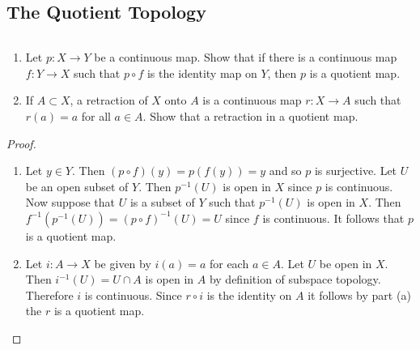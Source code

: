 \subsection{The Quotient Topology}
\begin{ex}{22.2}
    ${}$
    \begin{enumerate}
        \item Let $p:X\to Y$ be a continuous map. Show that if there is a continuous map $f:Y\to X$ such that $p\circ f$ is the identity map on $Y$, then $p$ is a quotient map.
        \item If $A\subset X$, a retraction of $X$ onto $A$ is a continuous map $r:X\to A$ such that $r(a)=a$ for all $a\in A$. Show that a retraction in a quotient map.
    \end{enumerate}
\end{ex}
\begin{proof}
    ${}$
    \begin{enumerate}
        \item Let $y\in Y$. Then $(p\circ f)(y)=p\left(f(y)\right)=y$ and so $p$ is surjective. 
            Let $U$ be an open subset of $Y$. Then $p^{-1}(U)$ is open in $X$ since $p$ is continuous.
            Now suppose that $U$ is a subset of $Y$ such that $p^{-1}(U)$ is open in $X$. Then $f^{-1}\left(p^{-1}(U)\right)=(p\circ f)^{-1}(U)=U$ since $f$ is continuous.
            It follows that $p$ is a quotient map.
        \item Let $i:A\to X$ be given by $i(a)=a$ for each $a\in A$. Let $U$ be open in $X$. Then $i^{-1}(U)=U\cap A$ is open in $A$ by definition of subspace topology. Therefore $i$ is continuous.
            Since $r\circ i$ is the identity on $A$ it follows by part (a) the $r$ is a quotient map.
    \end{enumerate}
\end{proof}

